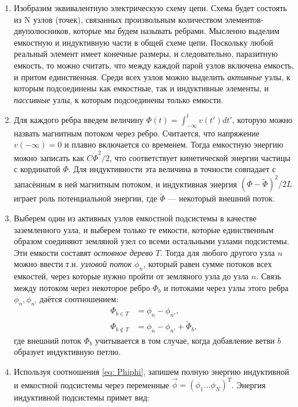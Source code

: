\begin{enumerate}
\item Изобразим эквивалентную электрическую схему цепи. Схема будет состоять из N узлов (точек), связанных произвольным количеством элементов-двуполюсников, которые мы будем называть ребрами. Мысленно выделим емкостную и индуктивную части в общей схеме цепи. Поскольку любой реальный элемент имеет конечные размеры, и следовательно, паразитную емкость, то можно считать, что между каждой парой узлов включена емкость, и притом единственная. Среди всех узлов можно выделить \textit{активные} узлы, к которым подсоединены как емкостные, так и индуктивные элементы, и \textit{пассивные} узлы, к которым подсоединены только емкости.

\item Для каждого ребра введем величину $\Phi(t)=\int_{-\infty}^{t} v(t')dt'$, которую можно назвать магнитным потоком через ребро. Считается, что напряжение $v(-\infty)=0$ и плавно включается со временем. Тогда емкостную энергию можно записать как $C\dot{\Phi}^2/2$, что соответствует кинетической энергии частицы с кординатой $\Phi$. Для индуктивности эта величина в точности совпадает с запасённым в ней магнитным потоком, и индуктивная энергия $(\Phi-\widetilde{\Phi})^2/2L$ играет роль потенциальной энергии, где $\widetilde{\Phi}$ --- некоторый внешний поток. 
\item Выберем один из активных узлов емкостной подсистемы в качестве заземленного узла, и выберем только те емкости, которые единственным образом соединяют земляной узел со всеми остальными узлами подсистемы. Эти емкости составят \textit{остовное дерево} $T$. Тогда для любого другого узла $n$ можно ввести т.н. \textit{узловой поток} $\phi_n$, который равен сумме потоков всех емкостей, через которые нужно пройти от земляного узла до узла $n$. Связь между потоком через некоторое ребро $\Phi_b$ и потоками через узлы этого ребра $\phi_n, \phi_{n'}$ даётся соотношением:
\begin{equation}\label{eq: Phiphi}
\begin{aligned}
	\Phi_{b\in T} &= \phi_n-\phi_{n'}, \\
	\Phi_{b\notin T} &= \phi_n-\phi_{n'} + \widetilde{\Phi}_b,
\end{aligned}
\end{equation}
где внешний поток ${\Phi}_b$ учитывается в том случае, когда добавление ветви $b$ образует индуктивную петлю.
\item Используя соотношения \eqref{eq: Phiphi}, запишем полную энергию индуктивной и емкостной подсистемы через переменные $\vec{\phi}=(\phi_1\ldots\phi_N)^T$.  Энергия индуктивной подсистемы примет вид:

\end{enumerate}
